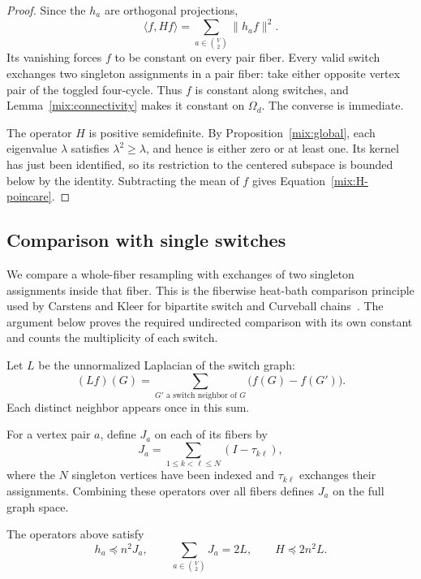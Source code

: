 \begin{proof}
Since the $h_a$ are orthogonal projections,
\[
\langle f,Hf\rangle=\sum_{a\in\binom V2}\|h_af\|^2.
\]
Its vanishing forces $f$ to be constant on every pair fiber. Every valid
switch exchanges two singleton assignments in a pair fiber: take either
opposite vertex pair of the toggled four-cycle. Thus $f$ is constant along
switches, and Lemma~\ref{mix:connectivity} makes it constant on $\Omega_d$.
The converse is immediate.

The operator $H$ is positive semidefinite. By
Proposition~\ref{mix:global}, each eigenvalue $\lambda$ satisfies
$\lambda^2\ge\lambda$, and hence is either zero or at least one.
Its kernel has just been identified, so its restriction to the centered
subspace is bounded below by the identity. Subtracting the mean of $f$
gives Equation~\eqref{mix:H-poincare}.
\end{proof}

\subsection{Comparison with single switches}

We compare a whole-fiber resampling with exchanges of two singleton
assignments inside that fiber. This is the fiberwise heat-bath
comparison principle used by Carstens and Kleer for bipartite switch
and Curveball chains~\cite[Theorems~2 and~7 and Appendix~A]{CK18}.
The argument below proves the required undirected comparison with
its own constant and counts the multiplicity of each switch.

Let $L$ be the unnormalized Laplacian of the switch graph:
\begin{equation}\label{mix:L}
(Lf)(G)=\sum_{G'\text{ a switch neighbor of }G}
\bigl(f(G)-f(G')\bigr).
\end{equation}
Each distinct neighbor appears once in this sum.

For a vertex pair $a$, define $J_a$ on each of its fibers by
\[
J_a=\sum_{1\le k<\ell\le N}(I-\tau_{k\ell}),
\]
where the $N$ singleton vertices have been indexed and $\tau_{k\ell}$
exchanges their assignments. Combining these operators over all fibers
defines $J_a$ on the full graph space.

\begin{lemma}\label{mix:comparison}
The operators above satisfy
\begin{equation}\label{mix:comparison-bounds}
h_a\preceq n^2J_a,\qquad
\sum_{a\in\binom V2}J_a=2L,\qquad
H\preceq2n^2L.
\end{equation}
\end{lemma}

